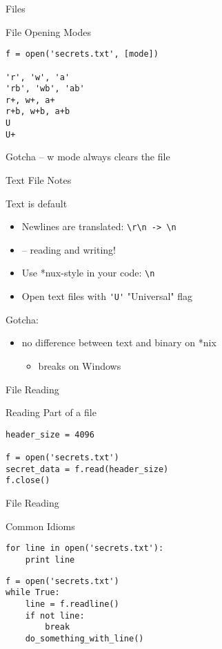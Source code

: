 \documentclass{beamer}
\begin{document}
\begin{frame}[fragile]{Files}

{\Large File Opening Modes}
\vfill
\begin{verbatim}
f = open('secrets.txt', [mode])

'r', 'w', 'a'
'rb', 'wb', 'ab'
r+, w+, a+
r+b, w+b, a+b
U
U+
\end{verbatim}
\vfill
{\Large Gotcha -- w mode always clears the file}
\end{frame}

\begin{frame}[fragile]{Text File Notes}

{\Large Text is default}
\begin{itemize}
  \item Newlines are translated: \verb|\r\n -> \n|
  \item   -- reading and writing!
  \item Use *nux-style in your code: \verb|\n|
  \item Open text files with \verb|'U'| "Universal" flag
\end{itemize}

\vfill
{\Large Gotcha:}
\begin{itemize}
  \item  no difference between text and binary on *nix\\
  \begin{itemize}
    \item breaks on Windows
  \end{itemize}
\end{itemize}

\end{frame}

\begin{frame}[fragile]{File Reading}

{\Large Reading Part of a file}

\begin{verbatim}
header_size = 4096

f = open('secrets.txt')
secret_data = f.read(header_size)
f.close()
\end{verbatim}

\end{frame}

\begin{frame}[fragile]{File Reading}

{\Large Common Idioms}

\begin{verbatim}
for line in open('secrets.txt'):
    print line
\end{verbatim}

\begin{verbatim}
f = open('secrets.txt')
while True:
    line = f.readline()
    if not line: 
        break
    do_something_with_line()
\end{verbatim}

\end{frame}
\end{document}
